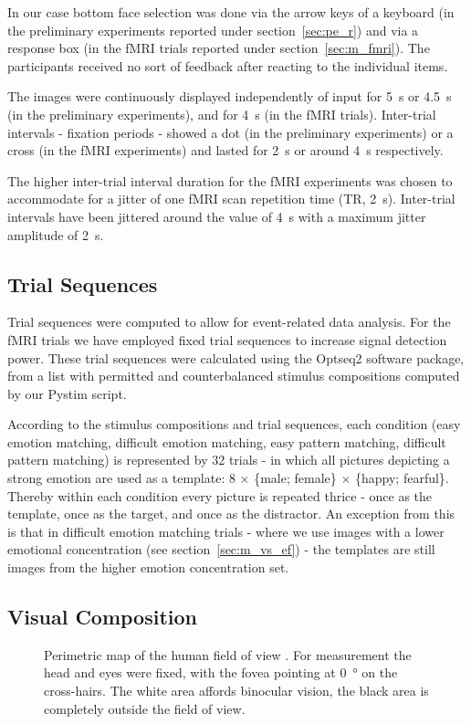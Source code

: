 	In our case bottom face selection was done via the arrow keys of a keyboard (in the preliminary experiments reported under section~\ref{sec:pe_r}) and via a response box (in the fMRI trials reported under section~\ref{sec:m_fmri}).
	The participants received no sort of feedback after reacting to the individual items.
	
	The images were continuously displayed independently of input for \SI{5}{\second} or \SI{4.5}{\second} (in the preliminary experiments), and for \SI{4}{\second} (in the fMRI trials).
	Inter-trial intervals - fixation periods - showed a dot (in the preliminary experiments) or a cross (in the fMRI experiments) and lasted for \SI{2}{\second} or around \SI{4}{\second} respectively.
	
	The higher inter-trial interval duration for the fMRI experiments was chosen to accommodate for a jitter of one fMRI scan repetition time (TR, \SI{2}{\second}).
	Inter-trial intervals have been jittered around the value of \SI{4}{\second} with a maximum jitter amplitude of \SI{2}{\second}.
	\subsection{Trial Sequences}
	    Trial sequences were computed to allow for event-related data analysis.
	    For the fMRI trials we have employed fixed trial sequences to increase signal detection power.
	    These trial sequences were calculated using the Optseq2 \citep{optseq} software package, from a list with permitted and counterbalanced stimulus compositions computed by our Pystim \citep{pystim} script.
	    
	    According to the stimulus compositions and trial sequences, each condition (easy emotion matching, difficult emotion matching, easy pattern matching, difficult pattern matching) is represented by 32 trials - in which all pictures depicting a strong emotion are used as a template: 8 $\times$ \{male; female\} $\times$ \{happy; fearful\}.
	    Thereby within each condition every picture is repeated thrice - once as the template, once as the target, and once as the distractor.
	    An exception from this is that in difficult emotion matching trials - where we use images with a lower emotional concentration (see section~\ref{sec:m_vs_ef}) - the templates are still images from the higher emotion concentration set.
	\subsection{Visual Composition}	
	    \begin{wrapfigure}{r}{0.45\textwidth}
		\centering
		\vspace{-1.0cm}
		\caption{Perimetric map of the human field of view \citep{Ruch1960}.
		For measurement the head and eyes were fixed, with the fovea pointing at \SI{0}{\degree} on the cross-hairs.
		The white area affords binocular vision, the black area is completely outside the field of view.}
		\label{fig:m_b_1}
		\vspace{-1.0cm}
	    \end{wrapfigure}
	    
